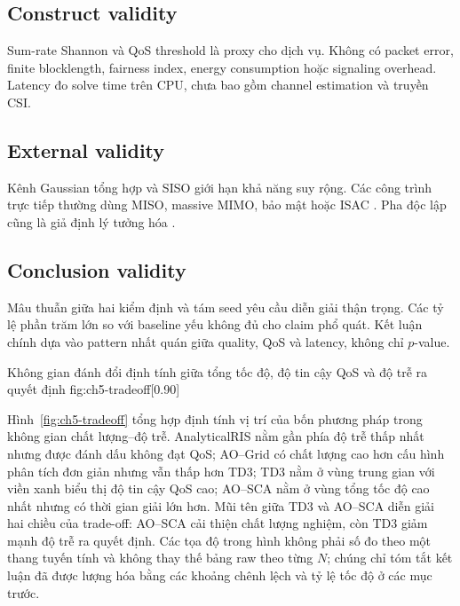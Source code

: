\subsection{Construct validity}
Sum-rate Shannon và QoS threshold là proxy cho dịch vụ. Không có packet error, finite blocklength, fairness index, energy consumption hoặc signaling overhead. Latency đo solve time trên CPU, chưa bao gồm channel estimation và truyền CSI.

\subsection{External validity}
Kênh Gaussian tổng hợp và SISO giới hạn khả năng suy rộng. Các công trình trực tiếp thường dùng MISO, massive MIMO, bảo mật hoặc ISAC \cite{Ge2024RSMAMassiveMIMO,Chang2024CovertSTARRSMA,Liu2025STARRSMAISAC}. Pha độc lập cũng là giả định lý tưởng hóa \cite{Liu2021STARCoupledPhase}.

\subsection{Conclusion validity}
Mâu thuẫn giữa hai kiểm định và tám seed yêu cầu diễn giải thận trọng. Các tỷ lệ phần trăm lớn so với baseline yếu không đủ cho claim phổ quát. Kết luận chính dựa vào pattern nhất quán giữa quality, QoS và latency, không chỉ $p$-value.

\begin{landscape}
{Không gian đánh đổi định tính giữa tổng tốc độ, độ tin cậy QoS và độ trễ ra quyết định}
{fig:ch5-tradeoff}[0.90\linewidth]
\end{landscape}

Hình~\ref{fig:ch5-tradeoff} tổng hợp định tính vị trí của bốn phương pháp trong không gian chất lượng--độ trễ. AnalyticalRIS nằm gần phía độ trễ thấp nhất nhưng được đánh dấu không đạt QoS; AO--Grid có chất lượng cao hơn cấu hình phân tích đơn giản nhưng vẫn thấp hơn TD3; TD3 nằm ở vùng trung gian với viền xanh biểu thị độ tin cậy QoS cao; AO--SCA nằm ở vùng tổng tốc độ cao nhất nhưng có thời gian giải lớn hơn. Mũi tên giữa TD3 và AO--SCA diễn giải hai chiều của trade-off: AO--SCA cải thiện chất lượng nghiệm, còn TD3 giảm mạnh độ trễ ra quyết định. Các tọa độ trong hình không phải số đo theo một thang tuyến tính và không thay thế bảng raw theo từng $N$; chúng chỉ tóm tắt kết luận đã được lượng hóa bằng các khoảng chênh lệch và tỷ lệ tốc độ ở các mục trước.

